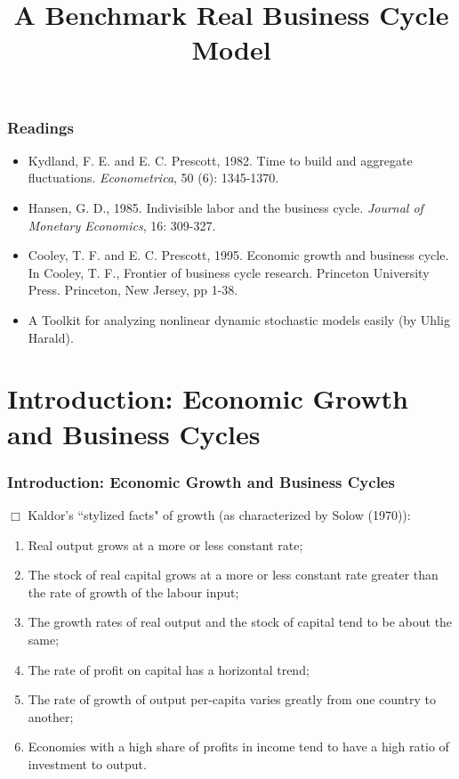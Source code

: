 \documentclass[handout]{beamer}
\title{A Benchmark Real Business Cycle Model} %
\date{}
\begin{document}
\frame{\titlepage}





\begin{frame}

\frametitle{Readings} \vskip 0.1in

\begin{itemize}
\item Kydland, F. E. and E. C. Prescott, 1982. Time to build and
aggregate fluctuations. \emph{Econometrica}, 50 (6): 1345-1370.
\item Hansen, G. D., 1985. Indivisible labor and the business cycle.
\emph{Journal of Monetary Economics}, 16: 309-327.
\item Cooley, T. F. and E. C. Prescott, 1995. Economic growth and business
cycle. In Cooley, T. F., Frontier of business cycle research.
Princeton University Press. Princeton, New Jersey, pp 1-38.
\item A Toolkit for analyzing nonlinear dynamic stochastic models easily (by Uhlig
Harald).
\end{itemize}


\end{frame}

\section{Introduction: Economic Growth and Business Cycles}

\begin{frame}

\frametitle{Introduction: Economic Growth and Business Cycles}
\vskip 0.1in
$\Box$ Kaldor's ``stylized facts" of growth (as characterized by
Solow (1970)): %

\begin{enumerate}
\item Real output grows at a more or less constant rate;
\item The stock of real capital grows at a more or less constant
rate greater than the rate of growth of the labour input;
\item The growth rates of real output and the stock of capital tend
to be about the same;
\item The rate of profit on capital has a horizontal trend;
\item The rate of growth of output per-capita varies greatly from one
country to another;
\item Economies with a high share of profits in income tend to have a
high ratio of investment to output.
\end{enumerate}

\end{frame}
\end{document}
